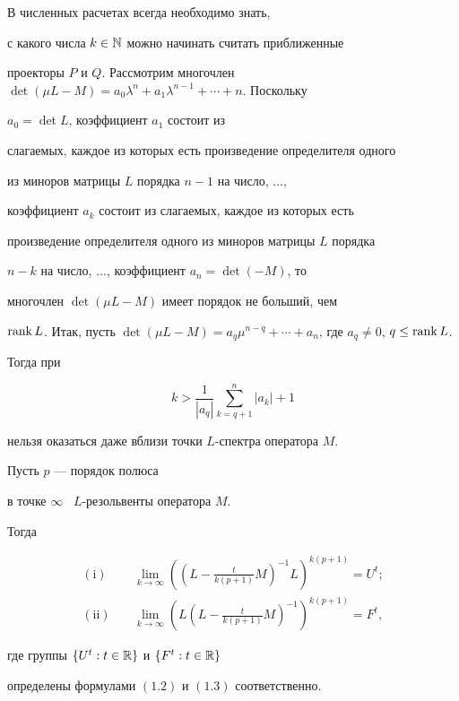 \begin{notes}


В численных расчетах всегда необходимо знать,


с какого числа $k\in{\Bbb N}$ можно начинать считать приближенные


проекторы $P$ и $Q$. Рассмотрим многочлен $\det (\mu L - M) =


a_0\lambda^n + a_1\lambda^{n-1} + \dotsb + n$. Поскольку


$a_0 = \det L$, коэффициент $a_1$ состоит из


слагаемых, каждое из которых есть произведение определителя одного


из миноров матрицы $L$ порядка $n-1$ на число, $\dotsc$,


коэффициент $a_k$ состоит из слагаемых, каждое из которых есть


произведение определителя одного из миноров матрицы $L$ порядка


$n-k$ на число, $\dotsc$, коэффициент $a_n = \det (-M)$, то


многочлен $\det(\mu L -M)$ имеет порядок не больший, чем


$\rank L$. Итак, пусть $\det(\mu L -


M)=a_q\mu^{n-q}+\dotsb+a_n$, где $a_q\neq 0$, $q\le\rank L$.


Тогда при


$$


k>\frac{1}{|a_q|}\sum_{k=q+1}^n |a_k| +1


$$


нельзя оказаться даже вблизи точки $L$-спектра оператора $M$.


\end{notes}





\begin{thms}


Пусть $p$ --- порядок полюса


в точке $\infty$ \ $L$-резольвенты оператора $M$.


Тогда


\begin{align}


\mathrm{(i)}\quad & \lim_{k\to\infty}


((L - \frac{t}{k(p+1)} M)^{-1} L)^{k(p+1)} = U^t; \\


%


\mathrm{(ii)}\quad & \lim_{k\to\infty}


(L(L - \frac{t}{k(p+1)} M)^{-1})^{k(p+1)} = F^t,


\end{align}


где группы $\{U^t : t\in{\Bbb R}\}$ и $\{F^t : t\in{\Bbb R}\}$


определены формулами $(1.2)$ и $(1.3)$ соответственно.


\end{thms}





